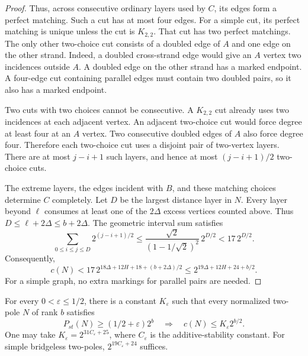 \begin{proof}
Thus, across consecutive ordinary layers used by $C$, its edges form a perfect matching.
Such a cut has at most four edges.
For a simple cut, its perfect matching is unique unless the cut is $K_{2,2}$.
That cut has two perfect matchings.
The only other two-choice cut consists of a doubled edge of $A$ and one edge on the other strand.
Indeed, a doubled cross-strand edge would give an $A$ vertex two incidences outside $A$.
A doubled edge on the other strand has a marked endpoint.
A four-edge cut containing parallel edges must contain two doubled pairs, so it also has a marked endpoint.

Two cuts with two choices cannot be consecutive.
A $K_{2,2}$ cut already uses two incidences at each adjacent vertex.
An adjacent two-choice cut would force degree at least four at an $A$ vertex.
Two consecutive doubled edges of $A$ also force degree four.
Therefore each two-choice cut uses a disjoint pair of two-vertex layers.
There are at most $j-i+1$ such layers, and hence at most $(j-i+1)/2$ two-choice cuts.

The extreme layers, the edges incident with $B$, and these matching choices determine $C$ completely.
Let $D$ be the largest distance layer in $N$.
Every layer beyond $\ell$ consumes at least one of the $2\Delta$ excess vertices counted above.
Thus $D\le\ell+2\Delta\le b+2\Delta$.
The geometric interval sum satisfies
\[
 \sum_{0\le i\le j\le D}2^{(j-i+1)/2}
 \le \frac{\sqrt2}{(1-1/\sqrt2)^2}\,2^{D/2}
 <17\,2^{D/2}.
\]
Consequently,
\[
 c(N)<17\,2^{18\Delta+12H+18+(b+2\Delta)/2}
 \le2^{19\Delta+12H+24+b/2}.
\]
For a simple graph, no extra markings for parallel pairs are needed.
\end{proof}

\begin{theorem}
\label{thm:high-path-cycle-tradeoff}
For every $0<\varepsilon\le1/2$, there is a constant $K_\varepsilon$ such that every normalized two-pole $N$ of rank $b$ satisfies
\[
 P_{st}(N)\ge(1/2+\varepsilon)2^b
 \quad\Longrightarrow\quad
 c(N)\le K_\varepsilon 2^{b/2}.
\]
One may take $K_\varepsilon=2^{31C_\varepsilon+25}$, where $C_\varepsilon$ is the additive-stability constant.
For simple bridgeless two-poles, $2^{19C_\varepsilon+24}$ suffices.
\end{theorem}


